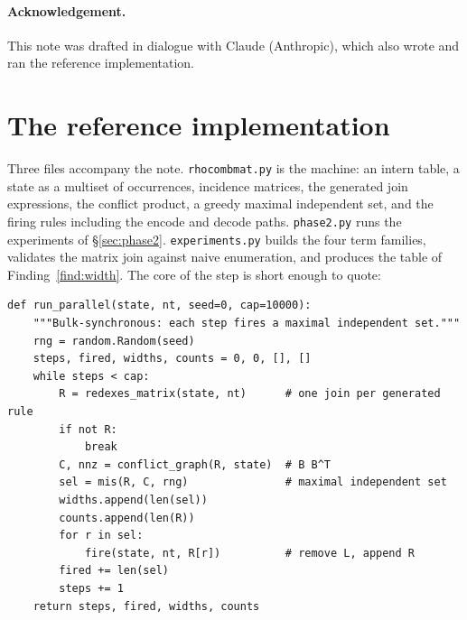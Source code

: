 \documentclass[11pt,a4paper]{article}
\theoremstyle{plain}
\theoremstyle{definition}
\theoremstyle{remark}
\begin{document}
\paragraph{Acknowledgement.} This note was drafted in dialogue with Claude
(Anthropic), which also wrote and ran the reference implementation.

\appendix
\section{The reference implementation}
\label{app:code}

Three files accompany the note. \texttt{rhocombmat.py} is the machine: an intern
table, a state as a multiset of occurrences, incidence matrices, the generated
join expressions, the conflict product, a greedy maximal independent set, and
the firing rules including the encode and decode paths.
\texttt{phase2.py} runs the experiments of \S\ref{sec:phase2}.
\texttt{experiments.py} builds the four term families, validates the matrix
join against naive enumeration, and produces the table of
Finding~\ref{find:width}. The core of the step is short enough to quote:

\begin{lstlisting}[style=py]
def run_parallel(state, nt, seed=0, cap=10000):
    """Bulk-synchronous: each step fires a maximal independent set."""
    rng = random.Random(seed)
    steps, fired, widths, counts = 0, 0, [], []
    while steps < cap:
        R = redexes_matrix(state, nt)      # one join per generated rule
        if not R:
            break
        C, nnz = conflict_graph(R, state)  # B B^T
        sel = mis(R, C, rng)               # maximal independent set
        widths.append(len(sel))
        counts.append(len(R))
        for r in sel:
            fire(state, nt, R[r])          # remove L, append R
        fired += len(sel)
        steps += 1
    return steps, fired, widths, counts
\end{lstlisting}
\end{document}
